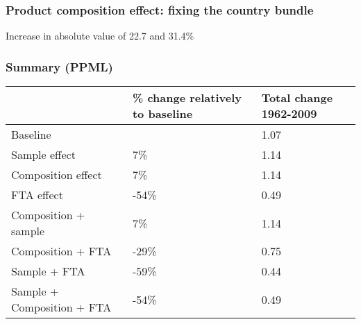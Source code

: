 \documentclass{beamer}
\begin{document}
\begin{frame}[plain]\frametitle{Product composition effect: fixing the country  bundle}
	\begin{figure}[h!]
		\begin{center}
			\setlength{\fboxrule}{1pt} %
			\setlength{\fboxsep}{.1in} %
		\end{center}
	\end{figure}
	Increase in absolute value of 22.7 and 31.4\%
\end{frame}






\begin{frame}[plain]\frametitle{Summary (PPML)}
\begin{table}[H]
\begin{center}
\begin{tabular}{|l|p{1in}|p{1in}|}
\hline
           & {\bf \% change relatively to baseline} & {\bf Total change 1962-2009} \\
\hline
Baseline  &     &  1.07 \\
\hline
Sample effect &        7\% &    1.14 \\
\hline
Composition effect &         7\% &     1.14 \\
\hline
FTA effect &        -54\% &         0.49 \\
\hline
Composition + sample &          7\% &         1.14 \\
\hline
Composition + FTA &      -29\% &        0.75 \\
\hline
Sample + FTA &       -59\%   &       0.44 \\
\hline
Sample + Composition + FTA &     -54\% &    0.49 \\
\hline
\end{tabular}
\end{center}
\end{table}
\end{frame}
\end{document}
